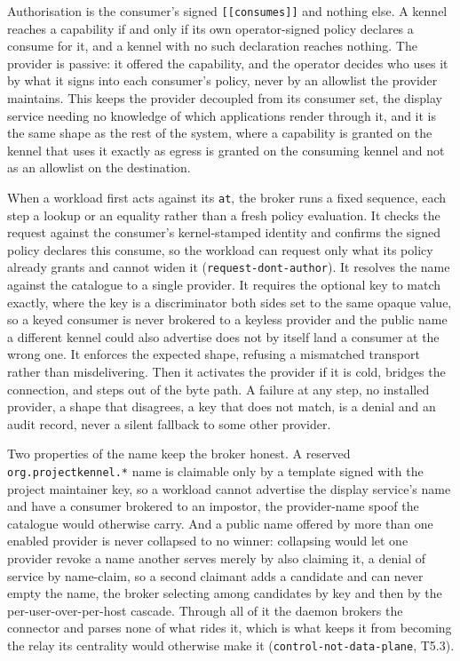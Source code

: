 Authorisation is the consumer's signed \texttt{{[}{[}consumes{]}{]}} and
nothing else. A kennel reaches a capability if and only if its own
operator-signed policy declares a consume for it, and a kennel with no
such declaration reaches nothing. The provider is passive: it offered
the capability, and the operator decides who uses it by what it signs
into each consumer's policy, never by an allowlist the provider
maintains. This keeps the provider decoupled from its consumer set, the
display service needing no knowledge of which applications render
through it, and it is the same shape as the rest of the system, where a
capability is granted on the kennel that uses it exactly as egress is
granted on the consuming kennel and not as an allowlist on the
destination.

When a workload first acts against its \texttt{at}, the broker runs a
fixed sequence, each step a lookup or an equality rather than a fresh
policy evaluation. It checks the request against the consumer's
kernel-stamped identity and confirms the signed policy declares this
consume, so the workload can request only what its policy already grants
and cannot widen it (\texttt{request-dont-author}). It resolves the name
against the catalogue to a single provider. It requires the optional key
to match exactly, where the key is a discriminator both sides set to the
same opaque value, so a keyed consumer is never brokered to a keyless
provider and the public name a different kennel could also advertise
does not by itself land a consumer at the wrong one. It enforces the
expected shape, refusing a mismatched transport rather than
misdelivering. Then it activates the provider if it is cold, bridges the
connection, and steps out of the byte path. A failure at any step, no
installed provider, a shape that disagrees, a key that does not match,
is a denial and an audit record, never a silent fallback to some other
provider.

Two properties of the name keep the broker honest. A reserved
\texttt{org.projectkennel.*} name is claimable only by a template signed
with the project maintainer key, so a workload cannot advertise the
display service's name and have a consumer brokered to an impostor, the
provider-name spoof the catalogue would otherwise carry. And a public
name offered by more than one enabled provider is never collapsed to no
winner: collapsing would let one provider revoke a name another serves
merely by also claiming it, a denial of service by name-claim, so a
second claimant adds a candidate and can never empty the name, the
broker selecting among candidates by key and then by the
per-user-over-per-host cascade. Through all of it the daemon brokers the
connector and parses none of what rides it, which is what keeps it from
becoming the relay its centrality would otherwise make it
(\texttt{control-not-data-plane}, T5.3).

